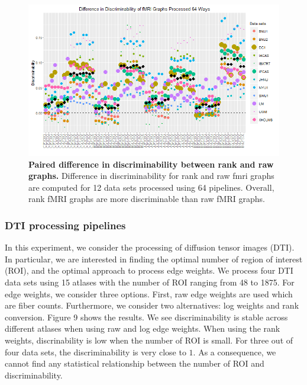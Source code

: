 \documentclass{article}
\begin{document}
\begin{figure}[ht!]
	\includegraphics[width=\linewidth]{../Figs/64_pipelines_differ.png}
	\caption{{ \bf Paired difference in discriminability between rank and raw graphs.} Difference in discriminability for rank and raw fmri graphs are computed for 12 data sets processed using 64 pipelines. Overall, rank fMRI graphs are more discriminable than raw fMRI graphs.}
	\label{fig:7}
\end{figure}




\subsubsection{DTI processing pipelines}
In this experiment, we consider the processing of diffusion tensor images (DTI). In particular, we are interested in finding the optimal number of region of interest (ROI), and the optimal approach to process edge weights. We process four DTI data sets using 15 atlases with the number of ROI ranging from 48 to 1875. For edge weights, we consider three options. First, raw edge weights are used which are fiber counts. Furthermore, we consider two alternatives: log weights and rank conversion. Figure 9 shows the results. We see discriminability is stable across different atlases when using raw and log edge weights. When using the rank weights, discrinability is low when the number of ROI is small. For three out of four data sets, the discriminability is very close to $1$. As a consequence, we cannot find any statistical relationship between the number of ROI and discriminability.
\end{document}
